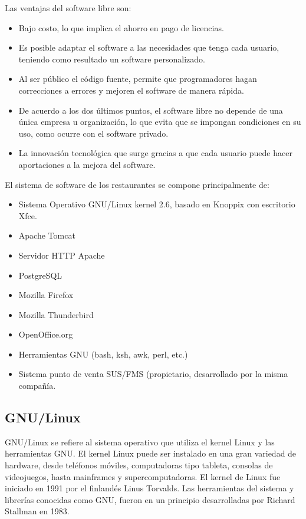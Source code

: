 Las ventajas del software libre son:

\begin{itemize}
 \item Bajo costo, lo que implica el ahorro en pago de licencias.
 \item Es posible adaptar el software a las necesidades que tenga cada usuario, teniendo como resultado un software personalizado.
 \item Al ser público el código fuente, permite que programadores hagan correcciones a errores y mejoren el software de manera rápida.
 \item De acuerdo a los dos últimos puntos, el software libre no depende de una única empresa u organización, lo que evita que se impongan condiciones en su uso, como ocurre con el software privado.
 \item La innovación tecnológica que surge gracias a que cada usuario puede hacer aportaciones a la mejora del software.
\end{itemize}

El sistema de software de los restaurantes se compone principalmente de:

\begin{itemize}
 \item Sistema Operativo GNU/Linux kernel 2.6, basado en Knoppix con escritorio Xfce.
 \item Apache Tomcat
 \item Servidor HTTP Apache
 \item PostgreSQL
 \item Mozilla Firefox
 \item Mozilla Thunderbird
 \item OpenOffice.org
 \item Herramientas GNU (bash, ksh, awk, perl, etc.)
 \item Sistema punto de venta SUS/FMS (propietario, desarrollado por la misma compañía.
\end{itemize}

\subsection{GNU/Linux}
\label{sec:linux}

GNU/Linux se refiere al sistema operativo que utiliza el kernel Linux y las herramientas GNU. El kernel Linux puede ser instalado en una gran variedad de hardware, desde teléfonos móviles, computadoras tipo tableta, consolas de videojuegos, hasta mainframes y supercomputadoras. El kernel de Linux fue iniciado en 1991 por el finlandés Linus Torvalds. Las herramientas del sistema y librerías conocidas como GNU, fueron en un principio desarrolladas por Richard Stallman en 1983.

